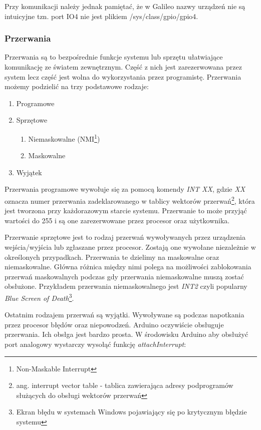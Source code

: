 \documentclass{xmgr}
\begin{document}
Przy komunikacji należy jednak pamiętać, że w Galileo nazwy urządzeń nie są intuicyjne tzn. port IO4 nie jest plikiem /sys/class/gpio/gpio4.

\subsubsection{Przerwania}

Przerwania są to bezpośrednie funkcje systemu lub sprzętu ułatwiające komunikację ze światem zewnętrznym. Część z nich jest zarezerwowana przez system lecz część jest wolna do wykorzystania przez programistę. Przerwania możemy podzielić na trzy podstawowe rodzaje:

\begin{enumerate}
	\item Programowe
	\item Sprzętowe
	\begin{enumerate}
		\item Niemaskowalne (NMI\footnote{Non-Maskable Interrupt})
		\item Maskowalne
	\end{enumerate}
	\item Wyjątek
\end{enumerate}

Przerwania programowe wywołuje się za pomocą komendy \emph{INT XX}, gdzie \emph{XX} oznacza numer przerwania zadeklarowanego w tablicy wektorów przerwań\footnote{ang. interrupt vector table - tablica zawierająca adresy podprogramów służących do obsługi wektorów przerwań}, która jest tworzona przy każdorazowym starcie systemu. Przerwanie to może przyjąć wartości do 255 i są one zarezerwowane przez procesor oraz użytkownika.

Przerwanie sprzętowe jest to rodzaj przerwań wywoływanych przez urządzenia wejścia/wyjścia lub zgłaszane przez procesor. Zostają one wywołane niezależnie w określonych przypadkach. Przerwania te dzielimy na maskowalne oraz niemaskowalne. Główna różnica między nimi polega na możliwości zablokowania przerwań maskowalnych podczas gdy przerwania niemaskowalne muszą zostać obsłużone. Przykładem przerwania niemaskowalnego jest \emph{INT2} czyli popularny \emph{Blue Screen of Death}\footnote{Ekran błędu w systemach Windows pojawiający się po krytycznym błędzie systemu}.

Ostatnim rodzajem przerwań są wyjątki. Wywoływane są podczas napotkania przez procesor błędów oraz niepowodzeń. Arduino oczywiście obsługuje przerwania. Ich obsłga jest bardzo prosta. W środowisku Arduino aby obsłużyć port analogowy wystarczy wysołąć funkcję \emph{attachInterrupt}:
\end{document}
